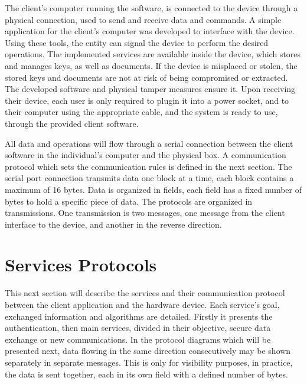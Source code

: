 The client's computer running the software, is connected to the device through a physical connection, used to send and receive data and commands. A simple application for the client's computer was developed to interface with the device.
Using these tools, the entity can signal the device to perform the desired operations.
The implemented services are available inside the device, which stores and manages keys, as well as documents.
If the device is misplaced or stolen, the stored keys and documents are not at risk of being compromised or extracted. The developed software and physical tamper measures ensure it.
Upon receiving their device, each user is only required to plugin it into a power socket, and to their computer using the appropriate cable, and the system is ready to use, through the provided client software.

All data and operations will flow through a serial connection between the client software in the individual's computer and the physical box. A communication protocol which sets the communication rules is defined in the next section.
The serial port connection transmits data one block at a time, each block contains a maximum of 16 bytes.
Data is organized in fields, each field has a fixed number of bytes to hold a specific piece of data.
The protocols are organized in transmissions. One transmission is two messages, one message from the client interface to the device, and another in the reverse direction.

\section{Services Protocols}\label{chap:arch:services}

This next section will describe the services and their communication protocol between the client application and the hardware device. Each service's goal, exchanged information and algorithms are detailed.
Firstly it presents the authentication, then main services, divided in their objective, secure data exchange or new communications.
In the protocol diagrams which will be presented next, data flowing in the same direction consecutively may be shown separately in separate messages. This is only for visibility purposes, in practice, the data is sent together, each in its own field with a defined number of bytes.

